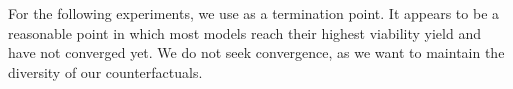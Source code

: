 \documentclass[./../../paper.tex]{subfiles}
\begin{document}



For the following experiments, we use  as a termination point. It appears to be a reasonable point in which most models reach their highest viability yield and have not converged yet. We do not seek convergence, as we want to maintain the diversity of our counterfactuals. 
\end{document}
